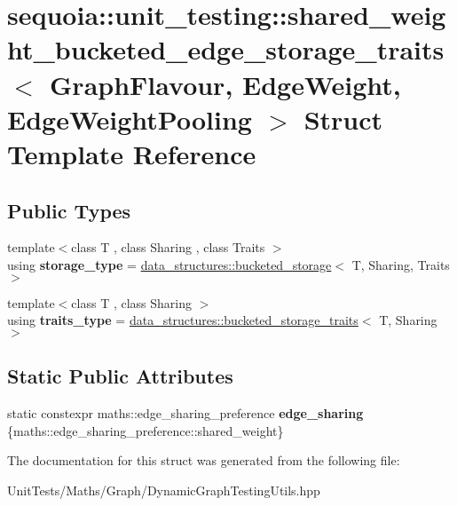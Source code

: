 \hypertarget{structsequoia_1_1unit__testing_1_1shared__weight__bucketed__edge__storage__traits}{}\section{sequoia\+::unit\+\_\+testing\+::shared\+\_\+weight\+\_\+bucketed\+\_\+edge\+\_\+storage\+\_\+traits$<$ Graph\+Flavour, Edge\+Weight, Edge\+Weight\+Pooling $>$ Struct Template Reference}
\label{structsequoia_1_1unit__testing_1_1shared__weight__bucketed__edge__storage__traits}
\subsection*{Public Types}
\begin{DoxyCompactItemize}
\item 
\mbox{\label{structsequoia_1_1unit__testing_1_1shared__weight__bucketed__edge__storage__traits_af846bc8f4a9116cd7f309f51fe942999}} 
{\footnotesize template$<$class T , class Sharing , class Traits $>$ }\\using {\bfseries storage\+\_\+type} = \mbox{\hyperlink{classsequoia_1_1data__structures_1_1bucketed__storage}{data\+\_\+structures\+::bucketed\+\_\+storage}}$<$ T, Sharing, Traits $>$
\item 
\mbox{\label{structsequoia_1_1unit__testing_1_1shared__weight__bucketed__edge__storage__traits_ad86aff08aa356a82ab79c29bce614757}} 
{\footnotesize template$<$class T , class Sharing $>$ }\\using {\bfseries traits\+\_\+type} = \mbox{\hyperlink{structsequoia_1_1data__structures_1_1bucketed__storage__traits}{data\+\_\+structures\+::bucketed\+\_\+storage\+\_\+traits}}$<$ T, Sharing $>$
\end{DoxyCompactItemize}
\subsection*{Static Public Attributes}
\begin{DoxyCompactItemize}
\item 
\mbox{\label{structsequoia_1_1unit__testing_1_1shared__weight__bucketed__edge__storage__traits_aaca46a66f769d2e6d51d0fdeec56e46e}} 
static constexpr maths\+::edge\+\_\+sharing\+\_\+preference {\bfseries edge\+\_\+sharing} \{maths\+::edge\+\_\+sharing\+\_\+preference\+::shared\+\_\+weight\}
\end{DoxyCompactItemize}


The documentation for this struct was generated from the following file\+:\begin{DoxyCompactItemize}
\item 
Unit\+Tests/\+Maths/\+Graph/Dynamic\+Graph\+Testing\+Utils.\+hpp\end{DoxyCompactItemize}
